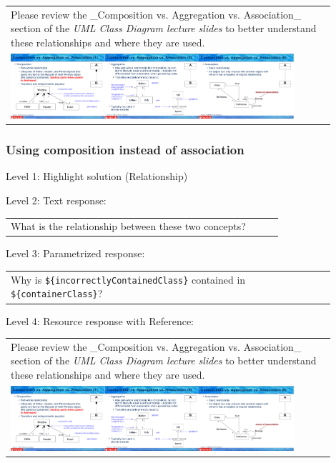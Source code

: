 \begin{tabular}{|p{0.9\linewidth}}
Please review the _Composition vs. Aggregation vs. Association_ section of 
the \textit{UML Class Diagram lecture slides} to 
better understand these relationships and where they are used.

\\
\includegraphics[width=0.9\textwidth]{images/composition_aggregation_association.png}
\end{tabular} \medskip


\subsubsection{Using composition instead of association}

\noindent Level 1: Highlight solution (Relationship) \medskip

\noindent Level 2: Text response: \medskip

\begin{tabular}{|p{0.9\linewidth}}
What is the relationship between these two concepts?
\end{tabular} \medskip

\noindent Level 3: Parametrized response: \medskip

\begin{tabular}{|p{0.9\linewidth}}
Why is \verb|${incorrectlyContainedClass}| contained in \verb|${containerClass}|?
\end{tabular} \medskip

\noindent Level 4: Resource response with Reference: \medskip

\begin{tabular}{|p{0.9\linewidth}}
Please review the _Composition vs. Aggregation vs. Association_ section of 
the \textit{UML Class Diagram lecture slides} to 
better understand these relationships and where they are used.

\\
\includegraphics[width=0.9\textwidth]{images/composition_aggregation_association.png}
\end{tabular} \medskip


